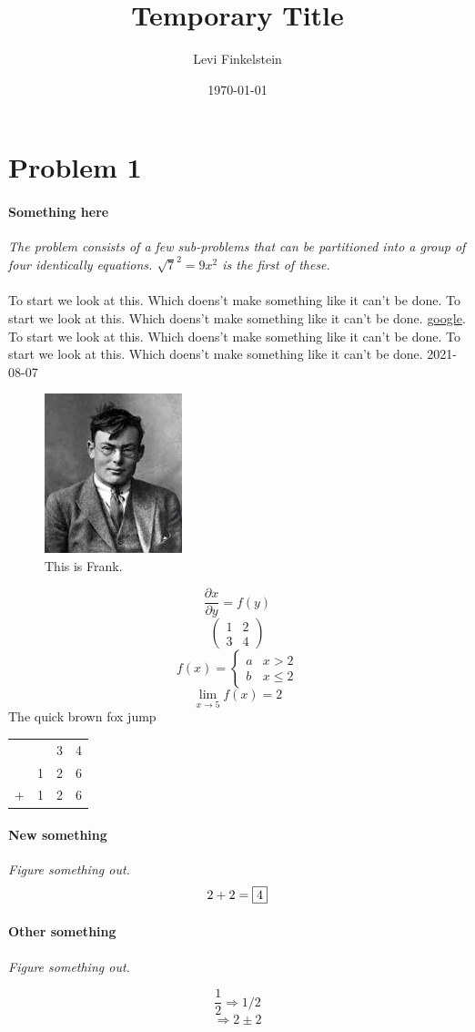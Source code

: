 \documentclass[12pt,english]{article}
\title{Temporary Title}
\author{Levi Finkelstein}
\date{\today}
\begin{document}
\maketitle

\section*{Problem 1}

\paragraph{Something here} 
\textit{The problem consists of a few sub-problems that can be partitioned into a group of four identically equations. $\sqrt{7}^2 = 9x^2$ is the first of these.}\\\\
To start we look at this. Which doens't make something like it can't be done.
To start we look at this. Which doens't make something like it can't be done.
\href{https://meme.com}{google}. 
To start we look at this. Which doens't make something like it can't be done.
To start we look at this. Which doens't make something like it can't be done.
2021-08-07

\begin{figure}[h]
    \caption{This is Frank.}
    \includegraphics[width=4cm]{frank}
\end{figure}

$$\frac{\partial x}{\partial y} = f(y)$$
$$\begin{pmatrix}
    1&2\\3&4
\end{pmatrix}$$
$$f(x)=\begin{cases}
    a&x>2\\b&x\leq2
\end{cases}$$
$$\lim_{x\to5}f(x)=2$$
The quick brown fox jump
\begin{center}
    \begin{tabular}{cccc}
            & & 3 & 4 \\
            & 1 & 2 & 6 \\
            \hline
        + & 1 & 2 & 6 \\
    \end{tabular}
\end{center}
\newpage

\paragraph{New something}
\textit{ Figure something out.}
$$2+2=\framebox{$4$}$$

\paragraph{Other something}
\textit{ Figure something out.}

$$\frac{1}{2} \Rightarrow 1/2$$
$$\Rightarrow 2\pm2$$
\end{document}
